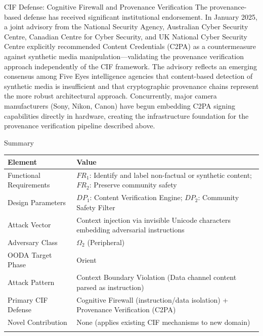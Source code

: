 \documentclass[
  ignorenonframetext,
]{beamer}
\newcounter{none} %
\begin{document}
\begin{frame}[allowframebreaks]{CIF Defense: Cognitive Firewall and
Provenance Verification}
The provenance-based defense has received significant institutional
endorsement. In January 2025, a joint advisory from the National
Security Agency, Australian Cyber Security Centre, Canadian Centre for
Cyber Security, and UK National Cyber Security Centre \cite{nsa2025c2pa}
explicitly recommended Content Credentials (C2PA) as a countermeasure
against synthetic media manipulation---validating the provenance
verification approach independently of the CIF framework. The advisory
reflects an emerging consensus among Five Eyes intelligence agencies
that content-based detection of synthetic media is insufficient and that
cryptographic provenance chains represent the more robust architectural
approach. Concurrently, major camera manufacturers (Sony, Nikon, Canon)
have begun embedding C2PA signing capabilities directly in hardware,
creating the infrastructure foundation for the provenance verification
pipeline described above.
\end{frame}

\begin{frame}[allowframebreaks]{Summary}
\protect{}\label{summary}
{\def\LTcaptype{none} %
\begin{longtable}[]{@{}
  >{\raggedright\arraybackslash}p{}
  >{\raggedright\arraybackslash}p{}@{}}
\toprule\noalign{}
\begin{minipage}[b]{\linewidth}\raggedright
Element
\end{minipage} & \begin{minipage}[b]{\linewidth}\raggedright
Value
\end{minipage} \\
\midrule\noalign{}
\endhead
Functional Requirements & \(FR_1\): Identify and label non-factual or
synthetic content; \(FR_2\): Preserve community safety \\
Design Parameters & \(DP_1\): Content Verification Engine; \(DP_2\):
Community Safety Filter \\
Attack Vector & Context injection via invisible Unicode characters
embedding adversarial instructions \\
Adversary Class & \(\Omega_2\) (Peripheral) \\
OODA Target Phase & Orient \\
Attack Pattern & Context Boundary Violation (Data channel content parsed
as instruction) \\
Primary CIF Defense & Cognitive Firewall (instruction/data isolation) +
Provenance Verification (C2PA) \\
Novel Contribution & None (applies existing CIF mechanisms to new
domain) \\
\bottomrule\noalign{}
\end{longtable}
}
\end{frame}
\end{document}
